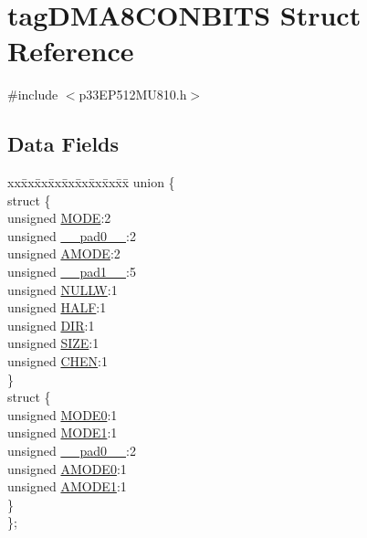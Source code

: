 \hypertarget{structtag_d_m_a8_c_o_n_b_i_t_s}{}\section{tag\+D\+M\+A8\+C\+O\+N\+B\+I\+TS Struct Reference}
\label{structtag_d_m_a8_c_o_n_b_i_t_s}


{\ttfamily \#include $<$p33\+E\+P512\+M\+U810.\+h$>$}

\subsection*{Data Fields}
\begin{DoxyCompactItemize}
\item 
\begin{tabbing}
xx\=xx\=xx\=xx\=xx\=xx\=xx\=xx\=xx\=\kill
union \{\\
\>struct \{\\
\>\>unsigned \hyperlink{structtag_d_m_a8_c_o_n_b_i_t_s_adc56ba18ff3f1599c85d222bee624424}{MODE}:2\\
\>\>unsigned \hyperlink{structtag_d_m_a8_c_o_n_b_i_t_s_adf71f3d8410c1f1dbbc96680a92c49af}{\_\_pad0\_\_}:2\\
\>\>unsigned \hyperlink{structtag_d_m_a8_c_o_n_b_i_t_s_ab3ff4e1f1b9a1037418ca7b6cb2e8f77}{AMODE}:2\\
\>\>unsigned \hyperlink{structtag_d_m_a8_c_o_n_b_i_t_s_acaf2d0924a107ec6e8d2e31febaf66f9}{\_\_pad1\_\_}:5\\
\>\>unsigned \hyperlink{structtag_d_m_a8_c_o_n_b_i_t_s_a1d3f7d04416314131889d1671a9287ad}{NULLW}:1\\
\>\>unsigned \hyperlink{structtag_d_m_a8_c_o_n_b_i_t_s_a1a715a64b2576f59401ac93d6f9a086a}{HALF}:1\\
\>\>unsigned \hyperlink{structtag_d_m_a8_c_o_n_b_i_t_s_ad6868749602045a76f36ffdf964dfd39}{DIR}:1\\
\>\>unsigned \hyperlink{structtag_d_m_a8_c_o_n_b_i_t_s_a5863cac6dc2cb330bdd0b1c66da70ffe}{SIZE}:1\\
\>\>unsigned \hyperlink{structtag_d_m_a8_c_o_n_b_i_t_s_a092934036fdfb8df5259db288fe438ca}{CHEN}:1\\
\>\} \\
\>struct \{\\
\>\>unsigned \hyperlink{structtag_d_m_a8_c_o_n_b_i_t_s_abc938903e74bff48935569d0c5b19035}{MODE0}:1\\
\>\>unsigned \hyperlink{structtag_d_m_a8_c_o_n_b_i_t_s_a7a9f7514566d0626724ce6c4b81b5ea2}{MODE1}:1\\
\>\>unsigned \hyperlink{structtag_d_m_a8_c_o_n_b_i_t_s_adf71f3d8410c1f1dbbc96680a92c49af}{\_\_pad0\_\_}:2\\
\>\>unsigned \hyperlink{structtag_d_m_a8_c_o_n_b_i_t_s_a0a1f894a2695c1388a5412244636805b}{AMODE0}:1\\
\>\>unsigned \hyperlink{structtag_d_m_a8_c_o_n_b_i_t_s_a3fde4abc0dc3db6fef6afc28c565ce3e}{AMODE1}:1\\
\>\} \\
\}; \\


\end{tabbing}
\end{DoxyCompactItemize}
